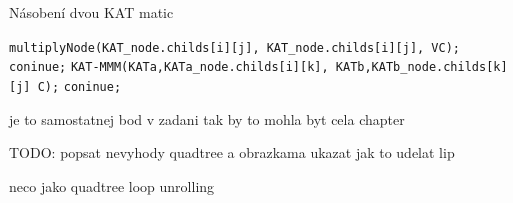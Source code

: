 \label{alg:kat-mmm}
\begin{algorithm}[H]
	\caption{Násobení dvou KAT matic}\label{kat-mmm}
	\begin{algorithmic}[1]
							\State \texttt{multiplyNode(KAT\_node.childs[i][j], KAT\_node.childs[i][j], VC);}
							\State \texttt{coninue;}
						\EndIf
							\State \texttt{KAT-MMM(KATa,KATa\_node.childs[i][k], KATb,KATb\_node.childs[k][j] C);}
							\State \texttt{coninue;}
						\EndIf
					\EndIf
				\EndFor
			\EndFor
		\EndFor
		\EndProcedure
	\end{algorithmic}
\end{algorithm}

je to samostatnej bod v zadani tak by to mohla byt cela chapter

TODO: popsat nevyhody quadtree a obrazkama ukazat jak to udelat lip

neco jako quadtree loop unrolling
